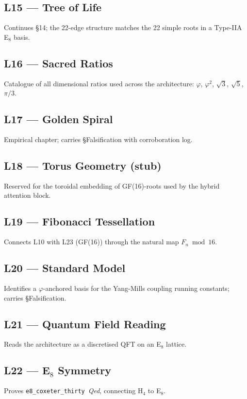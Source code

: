 \subsection*{L15 — Tree of Life} Continues §14; the 22-edge structure
matches the 22 simple roots in a Type-IIA E$_{8}$ basis.

\subsection*{L16 — Sacred Ratios} Catalogue of all dimensional ratios used
across the architecture: $\varphi$, $\varphi^{2}$, $\sqrt{3}$, $\sqrt{5}$,
$\pi/3$.

\subsection*{L17 — Golden Spiral} Empirical chapter; carries
§Falsification with corroboration log.

\subsection*{L18 — Torus Geometry (stub)} Reserved for the toroidal
embedding of GF(16)-roots used by the hybrid attention block.

\subsection*{L19 — Fibonacci Tessellation} Connects L10 with L23 (GF(16))
through the natural map $F_{n}\bmod 16$.

\subsection*{L20 — Standard Model} Identifies a $\varphi$-anchored basis
for the Yang-Mills coupling running constants; carries §Falsification.

\subsection*{L21 — Quantum Field Reading} Reads the architecture as a
discretised QFT on an E$_{8}$ lattice.

\subsection*{L22 — E$_{8}$ Symmetry} Proves
\texttt{e8\_coxeter\_thirty}~\emph{Qed}, connecting H$_{4}$ to E$_{8}$.

